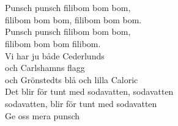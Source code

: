 {\footnotesize{}}\\
\\
Punsch punsch filibom bom bom,\\
filibom bom bom, filibom bom bom. \\
Punsch punsch filibom bom bom,\\
filibom bom bom filibom.\\
Vi har ju både Cederlunds \\
och Carlshamns flagg\\
och Grönstedts blå och lilla Caloric\\
Det blir för tunt med sodavatten, sodavatten\\
sodavatten, blir för tunt med sodavatten\\
Ge oss mera punsch
